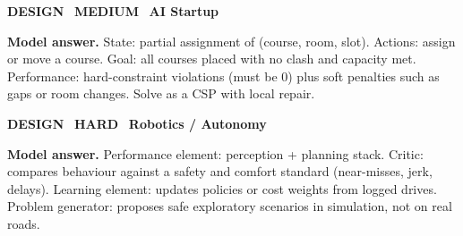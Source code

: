 \begin{tcolorbox}[enhanced,breakable,colback=white,colframe=crimson,arc=2mm,boxrule=0.8pt,left=3mm,right=3mm,
 title={\textbf{QI.09}\quad Design an agent that schedules campus classrooms. Give the state space and the performance measure.},fonttitle=\color{white}\small,colbacktitle=crimson]
\colorbox{crimson!15}{\scriptsize\bfseries\color{crimson} DESIGN}\
\colorbox{gold!85!black!15}{\scriptsize\bfseries\color{gold!85!black} MEDIUM}\
\colorbox{navy!8}{\scriptsize\bfseries\color{navy} AI Startup}\par\smallskip
\textbf{\color{navy}Model answer.} State: partial assignment of (course, room, slot). Actions: assign or move a course. Goal: all courses placed with no clash and capacity met. Performance: hard-constraint violations (must be 0) plus soft penalties such as gaps or room changes. Solve as a CSP with local repair.
\end{tcolorbox}
\begin{tcolorbox}[enhanced,breakable,colback=white,colframe=crimson,arc=2mm,boxrule=0.8pt,left=3mm,right=3mm,
 title={\textbf{QI.10}\quad Design a learning agent for an autonomous shuttle on a university campus. What are the critic and the problem generator?},fonttitle=\color{white}\small,colbacktitle=crimson]
\colorbox{crimson!15}{\scriptsize\bfseries\color{crimson} DESIGN}\
\colorbox{crimson!15}{\scriptsize\bfseries\color{crimson} HARD}\
\colorbox{navy!8}{\scriptsize\bfseries\color{navy} Robotics / Autonomy}\par\smallskip
\textbf{\color{navy}Model answer.} Performance element: perception + planning stack. Critic: compares behaviour against a safety and comfort standard (near-misses, jerk, delays). Learning element: updates policies or cost weights from logged drives. Problem generator: proposes safe exploratory scenarios in simulation, not on real roads.
\end{tcolorbox}